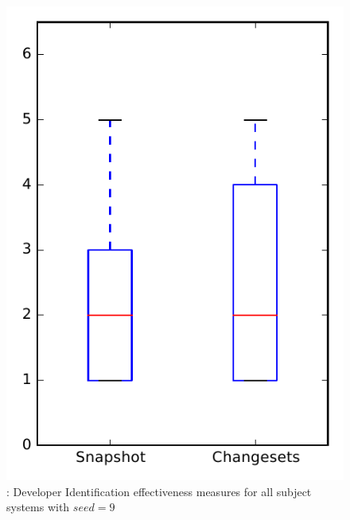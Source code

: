
\begin{figure}
\centering
\includegraphics[height=0.4\textheight]{figures/dit_seed/rq1_overview_9}
\caption{\rtwo: Developer Identification effectiveness measures for all subject systems with $seed=9$}
\label{fig:dit_seed:rq1:overview}
\end{figure}
